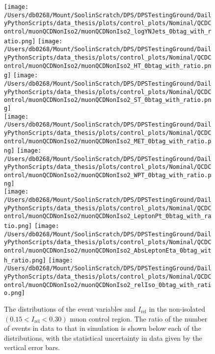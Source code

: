 \begin{figure}[hp!]
	\centering
	\texttt{[image: /Users/db0268/Mount/SoolinScratch/DPS/DPSTestingGround/DailyPythonScripts/data\_thesis/plots/control\_plots/Nominal/QCDControl/muonQCDNonIso2/muonQCDNonIso2\_logYNJets\_0btag\_with\_ratio.png]}
	\texttt{[image: /Users/db0268/Mount/SoolinScratch/DPS/DPSTestingGround/DailyPythonScripts/data\_thesis/plots/control\_plots/Nominal/QCDControl/muonQCDNonIso2/muonQCDNonIso2\_HT\_0btag\_with\_ratio.png]}
	\texttt{[image: /Users/db0268/Mount/SoolinScratch/DPS/DPSTestingGround/DailyPythonScripts/data\_thesis/plots/control\_plots/Nominal/QCDControl/muonQCDNonIso2/muonQCDNonIso2\_ST\_0btag\_with\_ratio.png]} \\
	\texttt{[image: /Users/db0268/Mount/SoolinScratch/DPS/DPSTestingGround/DailyPythonScripts/data\_thesis/plots/control\_plots/Nominal/QCDControl/muonQCDNonIso2/muonQCDNonIso2\_MET\_0btag\_with\_ratio.png]}
	\texttt{[image: /Users/db0268/Mount/SoolinScratch/DPS/DPSTestingGround/DailyPythonScripts/data\_thesis/plots/control\_plots/Nominal/QCDControl/muonQCDNonIso2/muonQCDNonIso2\_WPT\_0btag\_with\_ratio.png]} \\
	\texttt{[image: /Users/db0268/Mount/SoolinScratch/DPS/DPSTestingGround/DailyPythonScripts/data\_thesis/plots/control\_plots/Nominal/QCDControl/muonQCDNonIso2/muonQCDNonIso2\_LeptonPt\_0btag\_with\_ratio.png]} 
	\texttt{[image: /Users/db0268/Mount/SoolinScratch/DPS/DPSTestingGround/DailyPythonScripts/data\_thesis/plots/control\_plots/Nominal/QCDControl/muonQCDNonIso2/muonQCDNonIso2\_AbsLeptonEta\_0btag\_with\_ratio.png]}
	\texttt{[image: /Users/db0268/Mount/SoolinScratch/DPS/DPSTestingGround/DailyPythonScripts/data\_thesis/plots/control\_plots/Nominal/QCDControl/muonQCDNonIso2/muonQCDNonIso2\_relIso\_0btag\_with\_ratio.png]}
	\caption[The distributions of the event variables and $I_{\mathrm{rel}}$ in the non-isolated $(0.15 < I_{\mathrm{rel}} < 0.30)$ muon control region. The ratio of the number of events in data to that in simulation is shown below each of the distributions, with the statistical uncertainty in data given by the vertical error bars.]{The distributions of the event variables and $I_{\mathrm{rel}}$ in the non-isolated $(0.15 < I_{\mathrm{rel}} < 0.30)$ muon control region. The ratio of the number of events in data to that in simulation is shown below each of the distributions, with the statistical uncertainty in data given by the vertical error bars.}
	\label{fig:QCDmuNonIso2}
\end{figure}
